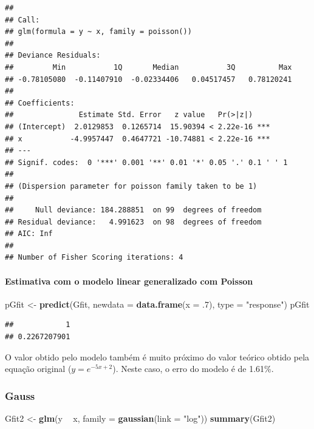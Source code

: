 \documentclass[a4paper]{article}
\newenvironment{Shaded}{\begin{snugshade}}{\end{snugshade}}
\newcommand{\KeywordTok}[1]{\textcolor[rgb]{0.13,0.29,0.53}{\textbf{#1}}}
\newcommand{\DataTypeTok}[1]{\textcolor[rgb]{0.13,0.29,0.53}{#1}}
\newcommand{\DecValTok}[1]{\textcolor[rgb]{0.00,0.00,0.81}{#1}}
\newcommand{\StringTok}[1]{\textcolor[rgb]{0.31,0.60,0.02}{#1}}
\newcommand{\OperatorTok}[1]{\textcolor[rgb]{0.81,0.36,0.00}{\textbf{#1}}}
\newcommand{\NormalTok}[1]{#1}
\let\oldparagraph\paragraph
\renewcommand{\paragraph}[1]{\oldparagraph{#1}\mbox{}}
\begin{document}
\begin{verbatim}
## 
## Call:
## glm(formula = y ~ x, family = poisson())
## 
## Deviance Residuals: 
##         Min           1Q       Median           3Q          Max  
## -0.78105080  -0.11407910  -0.02334406   0.04517457   0.78120241  
## 
## Coefficients:
##               Estimate Std. Error   z value   Pr(>|z|)    
## (Intercept)  2.0129853  0.1265714  15.90394 < 2.22e-16 ***
## x           -4.9957447  0.4647721 -10.74881 < 2.22e-16 ***
## ---
## Signif. codes:  0 '***' 0.001 '**' 0.01 '*' 0.05 '.' 0.1 ' ' 1
## 
## (Dispersion parameter for poisson family taken to be 1)
## 
##     Null deviance: 184.288851  on 99  degrees of freedom
## Residual deviance:   4.991623  on 98  degrees of freedom
## AIC: Inf
## 
## Number of Fisher Scoring iterations: 4
\end{verbatim}

\paragraph{Estimativa com o modelo linear generalizado com
Poisson}\label{estimativa-com-o-modelo-linear-generalizado-com-poisson}

\begin{Shaded}
\begin{Highlighting}[]
\NormalTok{pGfit <-}\StringTok{ }\KeywordTok{predict}\NormalTok{(Gfit, }\DataTypeTok{newdata =} \KeywordTok{data.frame}\NormalTok{(}\DataTypeTok{x =}\NormalTok{ .}\DecValTok{7}\NormalTok{), }\DataTypeTok{type =} \StringTok{"response"}\NormalTok{)}
\NormalTok{pGfit}
\end{Highlighting}
\end{Shaded}

\begin{verbatim}
##            1 
## 0.2267207901
\end{verbatim}

O valor obtido pelo modelo também é muito próximo do valor teórico
obtido pela equação original (\(y = e^{-5x + 2}\)). Neste caso, o erro
do modelo é de 1.61\%.

\subsubsection{Gauss}\label{gauss}

\begin{Shaded}
\begin{Highlighting}[]
\NormalTok{Gfit2 <-}\StringTok{ }\KeywordTok{glm}\NormalTok{(y }\OperatorTok{~}\StringTok{ }\NormalTok{x, }\DataTypeTok{family =} \KeywordTok{gaussian}\NormalTok{(}\DataTypeTok{link =} \StringTok{"log"}\NormalTok{))}
\KeywordTok{summary}\NormalTok{(Gfit2)}
\end{Highlighting}
\end{Shaded}
\end{document}

